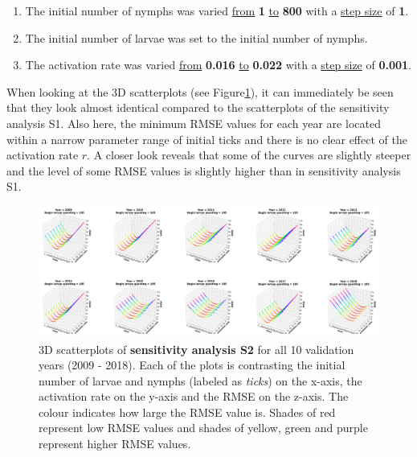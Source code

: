 \documentclass[a4paper, 11pt]{scrartcl}
\begin{document}
\begin{enumerate}
\item The initial number of nymphs was varied \underline{from} \textbf{1} \underline{to} \textbf{800} with a \underline{step size} of \textbf{1}.
\item The initial number of larvae was set to the initial number of nymphs.
\item The activation rate was varied \underline{from} \textbf{0.016} \underline{to} \textbf{0.022} with a \underline{step size} of \textbf{0.001}.
\end{enumerate}

When looking at the 3D scatterplots (see Figure\ref{fig:initial_ticks_without_beech_error}), it can immediately be seen that they look almost identical compared to the
scatterplots of the sensitivity analysis S1. Also here, the minimum RMSE values for each year are located within a narrow parameter range of initial ticks and there is no clear
effect of the activation rate $r$. A closer look reveals that some of the curves are slightly steeper and the level of some RMSE values is slightly higher than in sensitivity
analysis S1.

\begin{figure}[h!]
\centering
\includegraphics[width=\linewidth]{figures/initial_ticks_without_beech_error}
\caption{3D scatterplots of \textbf{sensitivity analysis S2} for all 10 validation years (2009 - 2018). Each of the plots is contrasting the initial number of larvae and nymphs
(labeled as \textit{ticks}) on the x-axis, the activation rate on the y-axis and the RMSE on the z-axis. The colour indicates how large the RMSE value is. Shades of red
represent low RMSE values and shades of yellow, green and purple represent higher RMSE values.}
\label{fig:initial_ticks_without_beech_error}
\end{figure}
\end{document}
